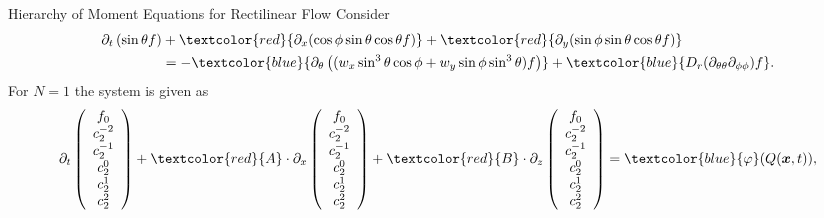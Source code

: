 \begin{frame}{Hierarchy of Moment Equations for Rectilinear Flow}
	\scriptsize
Consider
\begin{align*}
	\partial_{t}\left(\sin \theta f\right) &+ \textcolor{red}{\partial_x(\cos\phi \sin\theta \cos\theta f)} + \textcolor{red}{\partial_y(\sin \phi \sin \theta \cos \theta f )} \\
&= - \textcolor{blue}{\partial_\theta\left(( w_x \sin^3 \theta \cos \phi + w_y\sin \phi \sin^3 \theta) f\right)} + \textcolor{blue}{D_{r}(\partial_{\theta\theta}\partial_{\phi\phi})f}.
\end{align*}
	For $N=1$ the system is given as
	\begin{equation}
		\partial_t \left(\begin{array}{c}
			f_0 \\
			c_2^{-2} \\
			c_2^{-1} \\
			c_2^0 \\
			c_2^1 \\
			c_2^2
		\end{array}\right) + \textcolor{red}{A} \cdot \partial_x
		\left(\begin{array}{c}
			f_0 \\
			c_2^{-2} \\
			c_2^{-1} \\
			c_2^0 \\
			c_2^1 \\
			c_2^2
		\end{array}\right) + \textcolor{red}{B} \cdot \partial_z \left(\begin{array}{c}
			f_0 \\
			c_2^{-2} \\
			c_2^{-1} \\
			c_2^0 \\
			c_2^1 \\
			c_2^2
		\end{array}\right) =  \textcolor{blue}{\varphi} (Q(\boldsymbol{x},t)),
	\end{equation}
\end{frame}

